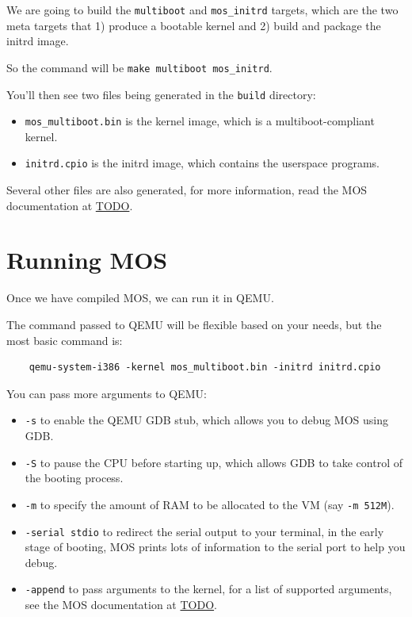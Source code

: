 We are going to build the \texttt{multiboot} and \texttt{mos\_initrd} targets, which are the two
meta targets that 1) produce a bootable kernel and 2) build and package the initrd image.

So the command will be \texttt{make multiboot mos\_initrd}.

You'll then see two files being generated in the \texttt{build} directory:

\begin{itemize}
    \item \texttt{mos\_multiboot.bin} is the kernel image, which is a multiboot-compliant kernel.
    \item \texttt{initrd.cpio} is the initrd image, which contains the userspace programs.
\end{itemize}

Several other files are also generated, for more information, read the MOS documentation at \href{TODO}{TODO}.

\section{Running MOS}

Once we have compiled MOS, we can run it in QEMU.

The command passed to QEMU will be flexible based on your needs, but the most basic command is:

\begin{verbatim}
    qemu-system-i386 -kernel mos_multiboot.bin -initrd initrd.cpio
\end{verbatim}

You can pass more arguments to QEMU:

\begin{itemize}
    \item \texttt{-s} to enable the QEMU GDB stub, which allows you to debug MOS using GDB.
    \item \texttt{-S} to pause the CPU before starting up, which allows GDB to take control of
          the booting process.
    \item \texttt{-m} to specify the amount of RAM to be allocated to the VM (say \texttt{-m 512M}).
    \item \texttt{-serial stdio} to redirect the serial output to your terminal, in the early stage
          of booting, MOS prints lots of information to the serial port to help you debug.
    \item \texttt{-append} to pass arguments to the kernel, for a list of supported arguments,
          see the MOS documentation at \href{TODO}{TODO}.
\end{itemize}

